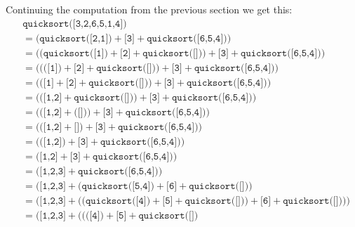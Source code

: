 Continuing the computation from the previous section
we get this:
\begin{align*}
&\texttt{quicksort([3,2,6,5,1,4])} 
\\
&= \bigl( 
   \texttt{quicksort([2,1])} + 
                \texttt{[3]} +
                \texttt{quicksort([6,5,4])} 
   \bigr)
\\
&= \bigl(
   \bigl(
       \texttt{quicksort([1])} +
       \texttt{[2]} +
       \texttt{quicksort([])} 
   \bigr)
   + \texttt{[3]} 
   + \texttt{quicksort([6,5,4])}
   \bigr)
\\
&= \bigl(
   \bigl(
       \bigl( \texttt{[1]} \bigr) +
       \texttt{[2]} +
       \texttt{quicksort([])} 
   \bigr)
   + \texttt{[3]} 
   + \texttt{quicksort([6,5,4])}   
   \bigr)
\\
&= \bigl(
   \bigl(
       \texttt{[1]} +
       \texttt{[2]} +
       \texttt{quicksort([])} 
   \bigr)
   + \texttt{[3]} 
   + \texttt{quicksort([6,5,4])}
   \bigr)
\\
&= \bigl(
   \bigl(
       \texttt{[1,2]} +
       \texttt{quicksort([])} 
   \bigr)
   + \texttt{[3]} 
   + \texttt{quicksort([6,5,4])}
   \bigr)
\\
&= \bigl(
   \bigl(
       \texttt{[1,2]} +
       \bigl( \texttt{[]} \bigr) 
   \bigr)
   + \texttt{[3]} 
   + \texttt{quicksort([6,5,4])}
   \bigr)
\\
&= \bigl(
   \bigl(
       \texttt{[1,2]} +
       \texttt{[]} 
   \bigr)
   + \texttt{[3]} 
   + \texttt{quicksort([6,5,4])}
   \bigr) 
\\
&= \bigl(
   \bigl(
       \texttt{[1,2]}
   \bigr)
   + \texttt{[3]} 
   + \texttt{quicksort([6,5,4])}
   \bigr)
\\
&= \bigl(
       \texttt{[1,2]}
   + \texttt{[3]} 
   + \texttt{quicksort([6,5,4])}
   \bigr)
\\
&= \bigl(
   \texttt{[1,2,3]}
   + \texttt{quicksort([6,5,4])}
   \bigr)
\\   
&= \bigl(
   \texttt{[1,2,3]}
   +
   \bigl( 
   \texttt{quicksort([5,4])}   
   + \texttt{[6]}
   + \texttt{quicksort([]}   
   \bigr)\bigr)
\\   
&= \bigl(
   \texttt{[1,2,3]}
   +
   \bigl( 
       \bigl(
       \texttt{quicksort([4])}
       + \texttt{[5]}
       + \texttt{quicksort([])}
       \bigr)
   + \texttt{[6]}
   + \texttt{quicksort([])}   
   \bigr)\bigr)
\\   
&= \bigl(
   \texttt{[1,2,3]}
   +
   \bigl( 
       \bigl(
       \bigl(\texttt{[4]}\bigr)
       + \texttt{[5]}
       + \texttt{quicksort([])}

\end{align*}
